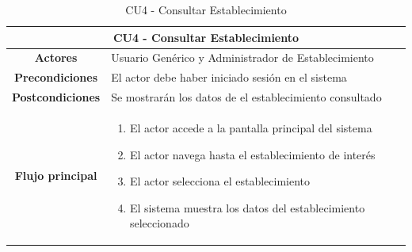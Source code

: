 \begin{table}[h]
    \centering
    \begin{tabular}{|c|p{10cm}|}
        \hline
        \multicolumn{2}{|c|}{\textbf{CU4 - Consultar Establecimiento}}                                \\
        \hline
        \textbf{Actores}         & Usuario Genérico y Administrador de Establecimiento                \\
        \hline
        \textbf{Precondiciones}  & El actor debe haber iniciado sesión en el sistema                  \\
        \hline
        \textbf{Postcondiciones} & Se mostrarán los datos de el establecimiento consultado            \\
        \hline
        \textbf{Flujo principal} & \begin{enumerate}
                                       \item El actor accede a la pantalla principal del sistema
                                       \item El actor navega hasta el establecimiento de interés
                                       \item El actor selecciona el establecimiento
                                       \item El sistema muestra los datos del establecimiento seleccionado
                                   \end{enumerate} \\
        \hline
    \end{tabular}
    \caption{CU4 - Consultar Establecimiento}
\end{table}

